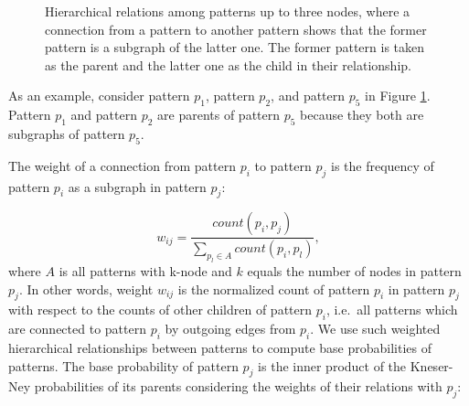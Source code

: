 \begin{figure}[!t]
\begin{center}
{
  }
  \end{center}
  \caption{
  Hierarchical relations among patterns up to three nodes, where a connection from a pattern to another pattern shows that the former pattern is a subgraph of the latter one. 
  The former pattern is taken as the parent and the latter one as the child in their relationship.
  } 
  \label{fig:parent-child-rel}
\end{figure}
%
As an example, consider pattern $p_1$, pattern $p_2$, and pattern $p_5$ in Figure \ref{fig:parent-child-rel}. 
Pattern $p_1$ and pattern $p_2$ are parents of pattern $p_5$ because they both are subgraphs of pattern $p_5$. 

The weight of a connection from pattern $p_i$ to pattern $p_j$ is the frequency of pattern $p_i$ as a subgraph in pattern $p_j$:

\begin{equation}
\label{eq:weights}
w_{ij} = \frac{count(p_i, p_j)}{\sum_{p_l \in A}count(p_i,p_l)},
\end{equation}
%
where $A$ is all patterns with k-node and $k$ equals the number of nodes in pattern $p_j$. 
In other words, weight $w_{ij}$ is the normalized count of pattern $p_i$ in pattern $p_j$ with respect to the counts of  other children of pattern  $p_i$, i.e.\ all patterns which are connected to pattern $p_i$ by outgoing edges from $p_i$.  
We use such weighted hierarchical relationships between patterns to compute base probabilities of patterns. 
The base probability of pattern $p_j$ is the inner product
of the \mbox{Kneser-Ney} probabilities of its parents considering the weights of their relations with $p_j$:

